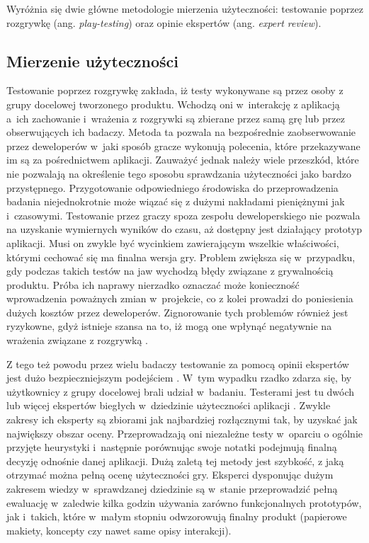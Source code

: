 \documentclass[a4paper,12pt,numbers=noenddot]{report}
\begin{document}
Wyróżnia się dwie główne metodologie mierzenia użyteczności: testowanie poprzez rozgrywkę (ang. \textit{play-testing}) oraz opinie ekspertów (ang. \textit{expert review}).

\subsection{Mierzenie użyteczności}
Testowanie poprzez rozgrywkę zakłada, iż testy wykonywane są przez osoby z grupy docelowej tworzonego produktu\cite{art_evaluatingPlayabilityMG}. Wchodzą oni w~interakcję z aplikacją a~ich zachowanie i~wrażenia z rozgrywki są zbierane przez samą grę lub przez obserwujących ich badaczy. Metoda ta pozwala na bezpośrednie zaobserwowanie przez deweloperów w~jaki sposób gracze wykonują polecenia, które przekazywane im są za pośrednictwem aplikacji.
Zauważyć jednak należy wiele przeszkód, które nie pozwalają na określenie tego sposobu sprawdzania użyteczności jako bardzo przystępnego. Przygotowanie odpowiedniego środowiska do przeprowadzenia badania niejednokrotnie może wiązać się z dużymi nakładami pieniężnymi jak i~czasowymi. Testowanie przez graczy spoza zespołu deweloperskiego nie pozwala na uzyskanie wymiernych wyników do czasu, aż dostępny jest działający prototyp aplikacji. Musi on zwykle być wycinkiem zawierającym wszelkie właściwości, którymi cechować się ma finalna wersja gry. Problem zwiększa się w~przypadku, gdy podczas takich testów na jaw wychodzą błędy związane z grywalnością produktu. Próba ich naprawy nierzadko oznaczać może konieczność wprowadzenia poważnych zmian w~projekcie, co z kolei prowadzi do poniesienia dużych kosztów przez deweloperów. Zignorowanie tych problemów również jest ryzykowne, gdyż istnieje szansa na to, iż mogą one wpłynąć negatywnie na wrażenia związane z rozgrywką \cite{art_evaluationOfMG}.

Z tego też powodu przez wielu badaczy testowanie za pomocą opinii ekspertów jest dużo bezpieczniejszym podejściem \cite{art_UsabilityTestingComp}. W~tym wypadku rzadko zdarza się, by użytkownicy z grupy docelowej brali udział w~badaniu. Testerami jest tu dwóch lub więcej ekspertów biegłych w~dziedzinie użyteczności aplikacji \cite{art_Nielsen}. Zwykle zakresy ich eksperty są zbiorami jak najbardziej rozłącznymi tak, by uzyskać jak największy obszar oceny. Przeprowadzają oni niezależne testy w~oparciu o ogólnie przyjęte heurystyki i~następnie porównując swoje notatki podejmują finalną decyzję odnośnie danej aplikacji.
Dużą zaletą tej metody jest szybkość, z jaką otrzymać można pełną ocenę użyteczności gry. Eksperci dysponując dużym zakresem wiedzy w~sprawdzanej dziedzinie są w~stanie przeprowadzić pełną ewaluację w~zaledwie kilka godzin używania zarówno funkcjonalnych prototypów, jak i~takich, które w~małym stopniu odwzorowują finalny produkt (papierowe makiety, koncepty czy nawet same opisy interakcji). 
\end{document}
